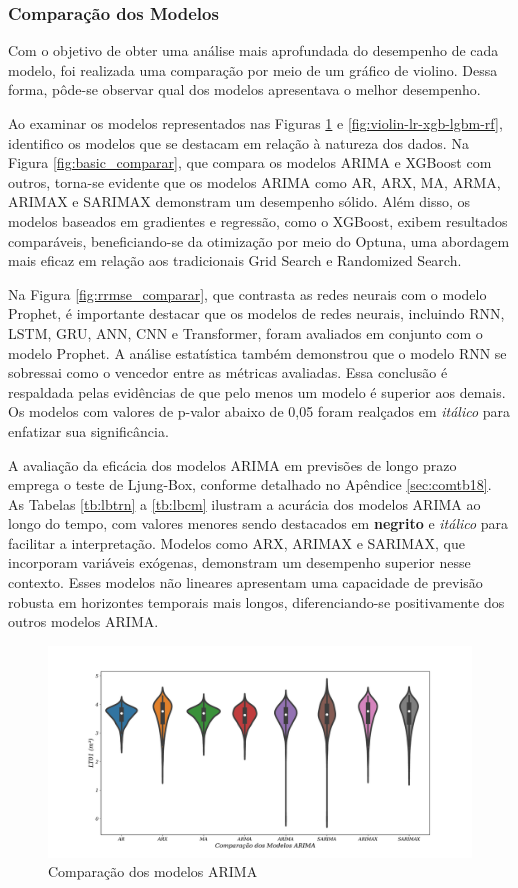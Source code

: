 \subsubsection{Compara\c c\~ao dos Modelos}

Com o objetivo de obter uma análise mais aprofundada do desempenho de cada modelo, foi realizada uma comparação por meio de um gráfico de violino. Dessa forma, pôde-se observar qual dos modelos apresentava o melhor desempenho.



Ao examinar os modelos representados nas Figuras \ref{fig:modelos-arima} e \ref{fig:violin-lr-xgb-lgbm-rf}, identifico os modelos que se destacam em relação à natureza dos dados. Na Figura \ref{fig:basic_comparar}, que compara os modelos ARIMA e XGBoost com outros, torna-se evidente que os modelos ARIMA como AR, ARX, MA, ARMA, ARIMAX e SARIMAX demonstram um desempenho sólido. Além disso, os modelos baseados em gradientes e regressão, como o XGBoost, exibem resultados comparáveis, beneficiando-se da otimização por meio do Optuna, uma abordagem mais eficaz em relação aos tradicionais Grid Search e Randomized Search.

Na Figura \ref{fig:rrmse_comparar}, que contrasta as redes neurais com o modelo Prophet, é importante destacar que os modelos de redes neurais, incluindo RNN, LSTM, GRU, ANN, CNN e Transformer, foram avaliados em conjunto com o modelo Prophet. A análise estatística também demonstrou que o modelo RNN se sobressai como o vencedor entre as métricas avaliadas. Essa conclusão é respaldada pelas evidências de que pelo menos um modelo é superior aos demais. Os modelos com valores de p-valor abaixo de 0,05 foram realçados em \textit{itálico} para enfatizar sua significância.

A avaliação da eficácia dos modelos ARIMA em previsões de longo prazo emprega o teste de Ljung-Box, conforme detalhado no Apêndice \ref{sec:comtb18}. As Tabelas \ref{tb:lbtrn} a \ref{tb:lbcm} ilustram a acurácia dos modelos ARIMA ao longo do tempo, com valores menores sendo destacados em \textbf{negrito} e \textit{itálico} para facilitar a interpretação. Modelos como ARX, ARIMAX e SARIMAX, que incorporam variáveis exógenas, demonstram um desempenho superior nesse contexto. Esses modelos não lineares apresentam uma capacidade de previsão robusta em horizontes temporais mais longos, diferenciando-se positivamente dos outros modelos ARIMA.

\begin{figure}[H]
	\centering
	\caption{Comparação dos modelos ARIMA}\label{fig:modelos-arima}
	\includegraphics[width=0.8\linewidth]{Resultados/Figuras/modelos-arima}
	

\end{figure}

